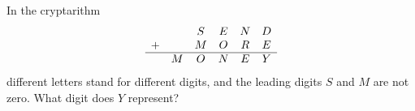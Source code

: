 In the cryptarithm
\[\begin{array}{cccccc}&&S&E&N&D\\+&&M&O&R&E\\\hline&M&O&N&E&Y\end{array}\]
different letters stand for different digits, and the leading digits $S$ and $M$ are not zero. What digit does $Y$ represent?
